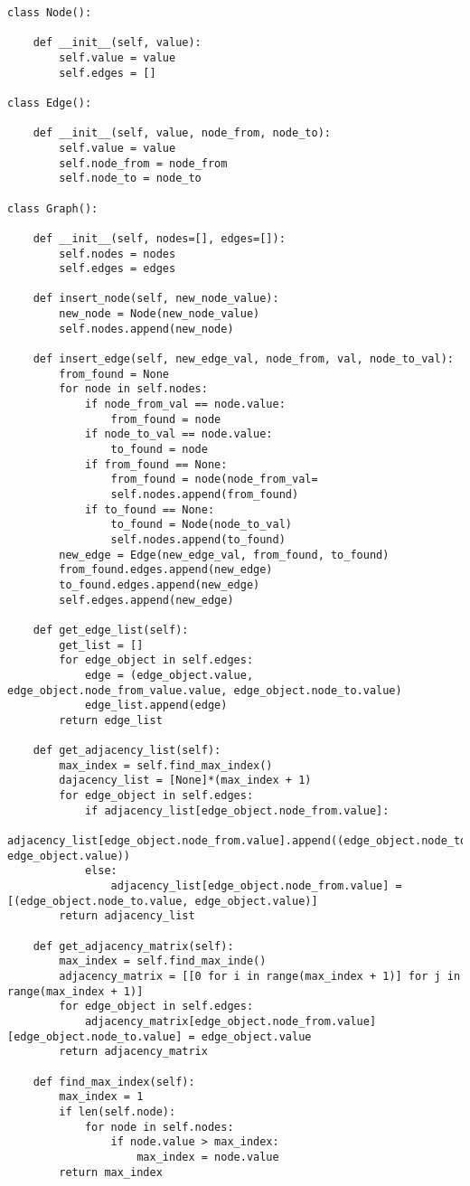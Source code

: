 \begin{lstlisting}[firstnumber=1, caption={Graph representation and fundamental operations.}]
class Node():

	def __init__(self, value):
		self.value = value
		self.edges = []

class Edge():

	def __init__(self, value, node_from, node_to):
		self.value = value
		self.node_from = node_from
		self.node_to = node_to
		
class Graph():
	
	def __init__(self, nodes=[], edges=[]):
		self.nodes = nodes
		self.edges = edges
	
	def insert_node(self, new_node_value):
		new_node = Node(new_node_value)
		self.nodes.append(new_node)
		
	def insert_edge(self, new_edge_val, node_from, val, node_to_val):
		from_found = None
		for node in self.nodes:
			if node_from_val == node.value:
				from_found = node
			if node_to_val == node.value:
				to_found = node
			if from_found == None:
				from_found = node(node_from_val=
				self.nodes.append(from_found)
			if to_found == None:
				to_found = Node(node_to_val)
				self.nodes.append(to_found)
		new_edge = Edge(new_edge_val, from_found, to_found)
		from_found.edges.append(new_edge)
		to_found.edges.append(new_edge)
		self.edges.append(new_edge)
	
	def get_edge_list(self):
		get_list = []
		for edge_object in self.edges:
			edge = (edge_object.value, edge_object.node_from_value.value, edge_object.node_to.value)
			edge_list.append(edge)
		return edge_list
	
	def get_adjacency_list(self):
		max_index = self.find_max_index()
		dajacency_list = [None]*(max_index + 1)
		for edge_object in self.edges:
			if adjacency_list[edge_object.node_from.value]:
				adjacency_list[edge_object.node_from.value].append((edge_object.node_to.value, edge_object.value))
			else:
				adjacency_list[edge_object.node_from.value] = [(edge_object.node_to.value, edge_object.value)]
		return adjacency_list
		
	def get_adjacency_matrix(self):
		max_index = self.find_max_inde()
		adjacency_matrix = [[0 for i in range(max_index + 1)] for j in range(max_index + 1)]
		for edge_object in self.edges:
			adjacency_matrix[edge_object.node_from.value][edge_object.node_to.value] = edge_object.value
		return adjacency_matrix
		
	def find_max_index(self):
		max_index = 1
		if len(self.node):
			for node in self.nodes:
				if node.value > max_index:
					max_index = node.value
		return max_index
\end{lstlisting}